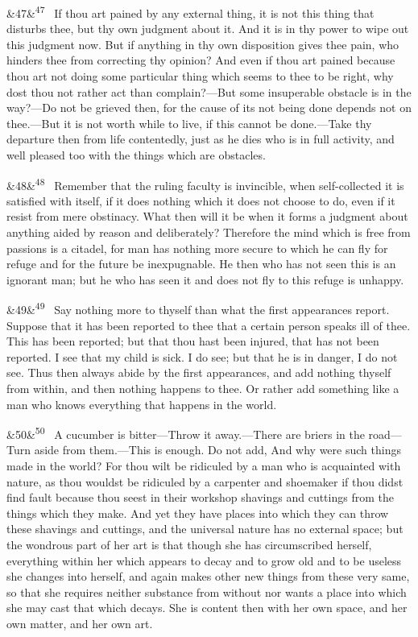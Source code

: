 \documentclass[12pt]{article}
\newcommand{\para}[1][]{\par\noindent\ifx&#1&\else\textsuperscript{\footnotesize #1}~\fi}
\begin{document}
\para[47] If thou art pained by any external thing, it is not this thing that
disturbs thee, but thy own judgment about it. And it is in thy power to
wipe out this judgment now. But if anything in thy own disposition gives
thee pain, who hinders thee from correcting thy opinion? And even if
thou art pained because thou art not doing some particular thing which
seems to thee to be right, why dost thou not rather act than
complain?---But some insuperable obstacle is in the way?---Do not be
grieved then, for the cause of its not being done depends not on
thee.---But it is not worth while to live, if this cannot be done.---Take
thy departure then from life contentedly, just as he dies who is in full
activity, and well pleased too with the things which are obstacles.

\para[48] Remember that the ruling faculty is invincible, when self-collected
it is satisfied with itself, if it does nothing which it does not choose
to do, even if it resist from mere obstinacy. What then will it be when
it forms a judgment about anything aided by reason and deliberately?
Therefore the mind which is free from passions is a citadel, for man has
nothing more secure to which he can fly for refuge and for the future be
inexpugnable. He then who has not seen this is an ignorant man; but he
who has seen it and does not fly to this refuge is unhappy.

\para[49] Say nothing more to thyself than what the first appearances report.
Suppose that it has been reported to thee that a certain person speaks
ill of thee. This has been reported; but that thou hast been injured,
that has not been reported. I see that my child is sick. I do see; but
that he is in danger, I do not see. Thus then always abide by the first
appearances, and add nothing thyself from within, and then nothing
happens to thee. Or rather add something like a man who knows everything
that happens in the world.

\para[50] A cucumber is bitter---Throw it away.---There are briers in the
road---Turn aside from them.---This is enough. Do not add, And why were
such things made in the world? For thou wilt be ridiculed by a man who
is acquainted with nature, as thou wouldst be ridiculed by a carpenter
and shoemaker if thou didst find fault because thou seest in their
workshop shavings and cuttings from the things which they make. And yet
they have places into which they can throw these shavings and cuttings,
and the universal nature has no external space; but the wondrous part of
her art is that though she has circumscribed herself, everything within
her which appears to decay and to grow old and to be useless she changes
into herself, and again makes other new things from these very same, so
that she requires neither substance from without nor wants a place into
which she may cast that which decays. She is content then with her own
space, and her own matter, and her own art.
\end{document}
